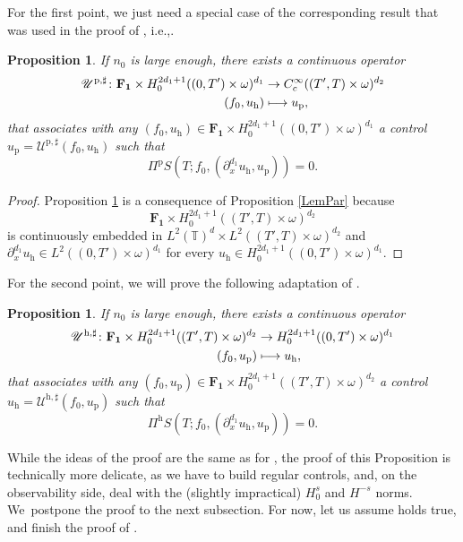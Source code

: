 \documentclass[11pt]{article}
\newcommand{\ie}{i.e.,\xspace}
\let\mathcal\mathscr
\def\mto{\mathchoice{\longmapsto}{\mapsto}{\mapsto}{\mapsto}}
\theoremstyle{plain}
\newtheorem{prop}[theorem]{Proposition}
\theoremstyle{definition}
\theoremstyle{remark}
\newcommand{\set}{\mathbb}
\newcommand{\T}{\set{T}}
\newcommand{\h}{{\mathrm h}}
\newcommand{\p}{{\mathrm p}}
\begin{document}
For the first point, we just need a special case of the corresponding result that was used in the proof of , \ie {}.
\begin{prop}
\label{LemPar_BIS1}
If $n_0$ is large enough, there exists a continuous operator
\begin{align*}
\mathcal U^{\p,\sharp} \colon \mathbf{F_1} \times H^{2d_1+1}_0((0,T')\times\omega)^{d_1} & \to C^\infty_c((T',T)\times\omega)^{d_2} \\
(f_0,u_{\h}) &\mto u_{\p},
\end{align*}
that associates with any $(f_0,u_{\h})\in \mathbf{F_1} \times H^{2d_1+1}_0((0,T')\times\omega)^{d_1} $ a control $u_{\p}=\mathcal U^{\p,\sharp}(f_0,u_{\h})$ such that
\begin{equation*}
\Pi^{\p} S(T;f_0, (\partial_x^{d_1} u_{\h},u_{\p})) = 0.
\end{equation*}
\end{prop}
\begin{proof}
Proposition \ref{LemPar_BIS1} is a consequence of Proposition \ref{LemPar} because
\[
\mathbf{F_1} \times H^{2d_1+1}_0((T',T)\times\omega)^{d_2}
\]
is continuously embedded in $L^2(\T)^d \times L^2((T',T)\times \omega)^{d_2}$ and $\partial_x^{d_1} u_{\h} \in L^2((0,T')\times\omega)^{d_1}$ for every $u_{\h} \in H^{2d_1+1}_0((0,T')\times\omega)^{d_1}$.
\end{proof}

For the second point, we will prove the following adaptation of .
\begin{prop}
\label{LemHyp_BIS1}
If $n_0$ is large enough, there exists a continuous operator
\begin{align*}
\mathcal U^{\h,\sharp} \colon
\mathbf{F_1} \times H_0^{2d_1+1}((T',T)\times\omega)^{d_2} & \to H^{2d_1+1}_0((0,T')\times\omega)^{d_1}\\
(f_0,u_{\p}) &\mto u_{\h},
\end{align*}
that associates with any $(f_0,u_{\p})\in \mathbf{F_1} \times H^{2d_1+1}_0((T',T)\times\omega)^{d_2} $ a control $u_{\h}=\mathcal U^{\h,\sharp}(f_0,u_{\p})$ such that
\begin{equation}\label{eq:LemHyp_BIS1}
\Pi^{\h} S(T;f_0, (\partial_x^{d_1} u_{\h},u_{\p})) = 0.
\end{equation}
\end{prop}
While the ideas of the proof are the same as for , the proof of this Proposition is technically more delicate, as we have to build regular controls, and, on the observability side, deal with the (slightly impractical) $H^s_0$ and $H^{-s}$ norms. We~postpone the proof to the next subsection. For now, let us assume  holds true, and finish the proof of .
\end{document}
